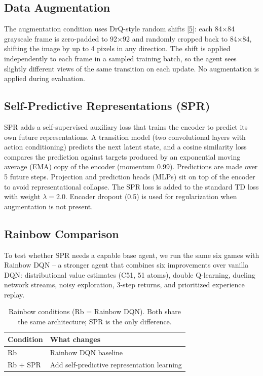 \documentclass[11pt]{article}
\newcommand{\citelink}[2]{\href{#1}{\small[#2]}}
\begin{document}
\subsection{Data Augmentation}

The augmentation condition uses DrQ-style random shifts
\citelink{https://arxiv.org/abs/2004.14990}{5}: each 84$\times$84
grayscale frame is zero-padded to 92$\times$92 and randomly cropped
back to 84$\times$84, shifting the image by up to 4 pixels in any
direction. The shift is applied independently to each frame in a
sampled training batch, so the agent sees slightly different views of
the same transition on each update. No augmentation is applied during
evaluation.

\subsection{Self-Predictive Representations (SPR)}

SPR adds a self-supervised auxiliary loss that trains the encoder to
predict its own future representations. A transition model (two
convolutional layers with action conditioning) predicts the next latent
state, and a cosine similarity loss compares the prediction against
targets produced by an exponential moving average (EMA) copy of the
encoder (momentum 0.99). Predictions are made over 5 future steps.
Projection and prediction heads (MLPs) sit on top of the encoder to
avoid representational collapse. The SPR loss is added to the standard
TD loss with weight $\lambda = 2.0$. Encoder dropout (0.5) is used for
regularization when augmentation is not present.

\subsection{Rainbow Comparison}

To test whether SPR needs a capable base agent, we run the same six
games with Rainbow DQN -- a stronger agent that combines six
improvements over vanilla DQN: distributional value estimates (C51,
51 atoms), double Q-learning, dueling network streams, noisy
exploration, 3-step returns, and prioritized experience replay.

\medskip
\begin{table}[H]
\centering
\renewcommand{\arraystretch}{1.5}
\setlength{\tabcolsep}{12pt}
\begin{tabular}{l l}
\toprule
\textbf{Condition} & \textbf{What changes} \\
\midrule
Rb       & Rainbow DQN baseline \\
Rb + SPR & Add self-predictive representation learning \\
\bottomrule
\end{tabular}
\caption{Rainbow conditions (Rb = Rainbow DQN). Both share the same
architecture; SPR is the only difference.}
\end{table}
\end{document}
